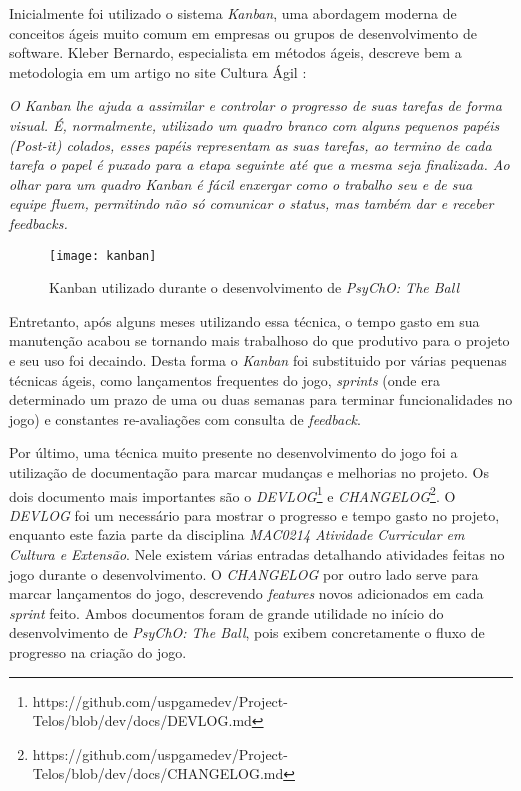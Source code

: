 Inicialmente foi utilizado o sistema \textit{Kanban}, uma abordagem moderna de conceitos ágeis muito comum em empresas ou grupos de desenvolvimento de software. Kleber Bernardo, especialista em métodos ágeis, descreve bem a metodologia em um artigo no site Cultura Ágil \cite{kleberkanban}:

\begin{displayquote}
  \textit{O Kanban lhe ajuda a assimilar e controlar o progresso de suas tarefas de forma visual. É, normalmente, utilizado um quadro branco com alguns pequenos papéis (Post-it) colados, esses papéis representam as suas tarefas, ao termino de cada tarefa o papel é puxado para a etapa seguinte até que a mesma seja finalizada. Ao olhar para um quadro Kanban é fácil enxergar como o trabalho seu e de sua equipe fluem, permitindo não só comunicar o status, mas também dar e receber feedbacks.}
\end{displayquote}

\begin{figure}[h!]
\texttt{[image: kanban]}
\centering
\caption{Kanban utilizado durante o desenvolvimento de \textit{PsyChO: The Ball}}
\end{figure}

Entretanto, após alguns meses utilizando essa técnica, o tempo gasto em sua manutenção acabou se tornando mais trabalhoso do que produtivo para o projeto e seu uso foi decaindo. Desta forma o \textit{Kanban} foi substituido por várias pequenas técnicas ágeis, como lançamentos frequentes do jogo, \textit{sprints} (onde era determinado um prazo de uma ou duas semanas para terminar funcionalidades no jogo) e constantes re-avaliações com consulta de \textit{feedback}.

Por último, uma técnica muito presente no desenvolvimento do jogo foi a utilização de documentação para marcar mudanças e melhorias no projeto. Os dois documento mais importantes são o \textit{DEVLOG}\footnote{https://github.com/uspgamedev/Project-Telos/blob/dev/docs/DEVLOG.md} e \textit{CHANGELOG}\footnote{https://github.com/uspgamedev/Project-Telos/blob/dev/docs/CHANGELOG.md}. O \textit{DEVLOG} foi um necessário para mostrar o progresso e tempo gasto no projeto, enquanto este fazia parte da disciplina \textit{MAC0214 Atividade Curricular em Cultura e Extensão}. Nele existem várias entradas detalhando atividades feitas no jogo durante o desenvolvimento. O \textit{CHANGELOG} por outro lado serve para marcar lançamentos do jogo, descrevendo \textit{features} novos adicionados em cada \textit{sprint} feito. Ambos documentos foram de grande utilidade no início do desenvolvimento de \textit{PsyChO: The Ball}, pois exibem concretamente o fluxo de progresso na criação do jogo.

